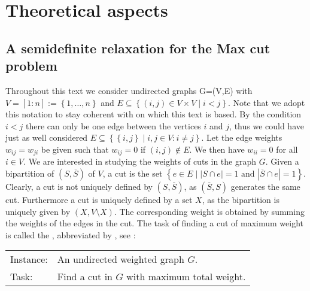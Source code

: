 \documentclass[12pt,a4paper]{article}
\theoremstyle{mythm}
\begin{document}
\newpage

\section{Theoretical aspects} 
\subsection{A semidefinite relaxation for the Max cut problem} 
\label{sec:GoemansWilliamson} 
Throughout this text we consider undirected graphs G=(V,E) with $ V = \left[ 1:n \right] := \left\{ 1, \dots , n \right\} $ and $ E \subseteq \left\{ \left( i,j \right)  \in V \times V \mid i<j \right\} $.
Note that we adopt this notation to stay coherent with \cite{Burer2002} on which this text is based.
By the condition $ i < j $ there can only be one edge between the vertices $ i $ and $ j $, thus we could have just as well considered $ E \subseteq \left\{ \left\{ i,j
\right\}  \mid i,j \in V: i \neq j  \right\} $.
Let the edge weights $ w _{ ij } = w _{ ji }  $ be given such that $ w _{ ij } = 0 $ if $ \left( i,j \right) \notin E $. We then have $ w _{ ii } = 0 $ for all $ i \in V $.
We are interested in studying the weights of cuts in the graph $ G $.
Given a bipartition of $ \left( S , \overline{ S }  \right)  $ of $ V $, a cut is the set $ \left\{ e \in E \mid \left| S \cap e \right| = 1 \text{ and } \left| \overline{ S }
\cap e \right| = 1  \right\}  $. Clearly, a cut is not uniquely defined by $ \left( S , \overline{ S }  \right)  $, as $ \left( \overline{ S } , S \right)  $ generates the
same cut. 
Furthermore a cut is uniquely defined by a set $ X $, as the bipartition is uniquely given by $ \left( X, V \setminus X \right)  $.
The corresponding weight is obtained by summing the weights of the edges in the cut.
The task of finding a cut of maximum weight is called the \mcp , abbreviated by \MCP, see \cite{Korte2018}:
\begin{mdframed}[frametitle= {Maximum Weight Cut Problem}]
\begin{tabular}{ll}
Instance: &An undirected weighted graph $ G $. \\
Task: &Find a cut in $ G $ with maximum total weight.
\end{tabular}
\end{mdframed}
\end{document}
